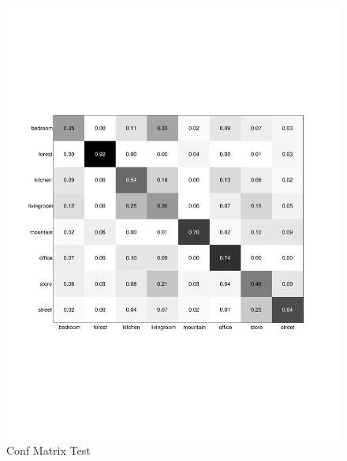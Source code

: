 \documentclass[subfigure,epsfig,fleqn,float,numbers=noenddot]{scrartcl}
\begin{document}
\begin{figure}
		\centering
		\includegraphics[width=\textwidth]{img/conf_matrix_test.pdf}
		\caption{Conf Matrix Test}
		\label{fig:conf_matrix_test}
\end{figure}
\end{document}
